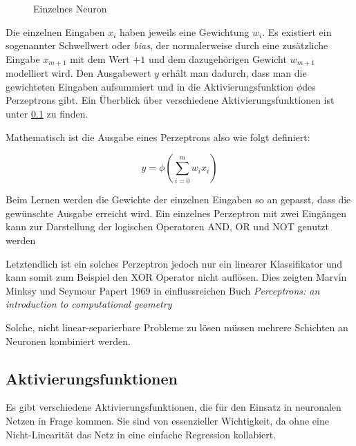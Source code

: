 \begin{figure}
    \centering
	\caption{Einzelnes Neuron}
	\label{fig:singleNeuron}
\end{figure}

Die einzelnen Eingaben \(x_i\) haben jeweils eine Gewichtung \(w_i\).
Es existiert ein sogenannter Schwellwert oder \textit{bias}, der normalerweise 
durch eine zusätzliche Eingabe \(x_{m+1}\) mit dem Wert \(+1\) und dem dazugehörigen Gewicht \(w_{m+1}\) modelliert wird.
Den Ausgabewert \(y\) erhält man dadurch, dass man die gewichteten Eingaben aufsummiert und in die Aktivierungsfunktion \( \phi \)des Perzeptrons gibt.
Ein Überblick über verschiedene Aktivierungsfunktionen ist unter \ref{sec:activationfuncs} zu finden.

Mathematisch ist die Ausgabe eines Perzeptrons also wie folgt definiert:

\begin{equation}
	y = \phi ( \sum_{i= 0}^{m} w_i x_i)
\end{equation}

Beim Lernen werden die Gewichte der einzelnen Eingaben so an gepasst, dass die gewünschte Ausgabe erreicht wird.
Ein einzelnes Perzeptron mit zwei Eingängen kann zur Darstellung der logischen Operatoren AND, OR und NOT genutzt werden

Letztendlich ist ein solches Perzeptron jedoch nur ein linearer Klassifikator und kann somit zum Beispiel den XOR Operator nicht auflösen.
Dies zeigten Marvin Minksy und Seymour Papert 1969 in einflussreichen Buch \textit{Perceptrons: an introduction to computational geometry} 

Solche, nicht linear-separierbare Probleme zu lösen müssen mehrere Schichten an Neuronen kombiniert werden.

\subsection{Aktivierungsfunktionen}
\label{sec:activationfuncs}
Es gibt verschiedene Aktivierungsfunktionen, die für den Einsatz in neuronalen Netzen in Frage kommen.
Sie sind von essenzieller Wichtigkeit, da ohne eine Nicht-Linearität das Netz in eine einfache Regression kollabiert.

